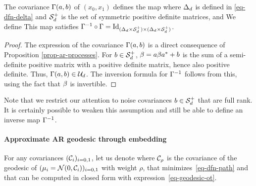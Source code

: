 \begin{proposition}
	The covariance $\Gamma(a,b)$ of $(x_0,x_1)$ defines the map
	where $\Delta_d$ is defined in \eqref{eq-dfn-delta} and $\mathcal{S}_d^+$ is the set of symmetric
	positive definite matrices, and
	We define
	This map satisfies $\Gamma^{-1} \circ \Gamma = \operatorname{Id}_{(\Delta_d \times \mathcal{S}_d^+) \times (\Delta_d \times \mathcal{S}_d^+)}$.
\end{proposition}
\begin{proof}
	The expression of the covariance $\Gamma(a,b)$ is a direct consequence of Proposition \ref{prop-ar-processes}. For $b \in \mathcal{S}_d^+$, $\beta = a \beta a^* + b$ is the sum of a  semi-definite positive matrix with a positive definite matrix, hence also positive definite. Thus, $\Gamma(a,b) \in \mathcal{U}_d$.
	The inversion formula for $\Gamma^{-1}$ follows from this, using the fact that $\beta$ is invertible.
\end{proof}

Note that we restrict our attention to noise covariances $b \in \mathcal{S}_d^+$ that are full rank. It is certainly possible to weaken this assumption and still be able to define an inverse map $\Gamma^{-1}$.

\paragraph{Approximate AR geodesic through embedding}


For any covariances $(\mathcal{C}_i)_{i=0,1}$, let us denote
where $\mathcal{C}_\rho$ is the covariance of the geodesic of $(\mu_i=\mathcal{N}(0,\mathcal{C}_i))_{i=0,1}$ with weight $\rho$, that minimizes~\eqref{eq-dfn-path} and that can be computed in closed form with expression~\eqref{eq-geodesic-ot}.

